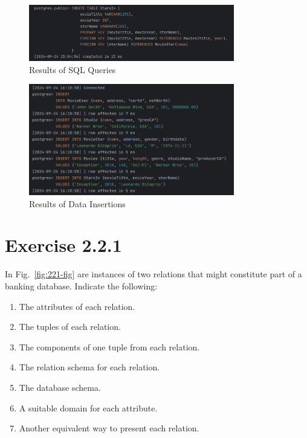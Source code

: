\documentclass{cshwk}
\begin{document}
\begin{figure}[H]
    \centering
    \includegraphics[width=0.8\textwidth]{hw2-4.png}
    \caption{Results of SQL Queries}
    \label{fig:table_create_2}
\end{figure}

\begin{figure}[H]
    \centering
    \includegraphics[width=0.8\textwidth]{hw2-5.png}
    \caption{Results of Data Insertions}
    \label{fig:data_instertions}
\end{figure}


\section{Exercise 2.2.1}

In Fig.~\ref{fig:221-fig} are instances of two relations that might constitute
part of a banking database. Indicate the following:
\begin{enumerate}
    \item The attributes of each relation.
    \item The tuples of each relation.
    \item The components of one tuple from each relation.
    \item The relation schema for each relation.
    \item The database schema.
    \item A suitable domain for each attribute.
    \item Another equivalent way to present each relation.
\end{enumerate}
\end{document}
